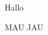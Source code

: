 \documentclass[Dokumentation]{Lilly}
\begin{document}
Hallo

\makeatletter
\ifLILLY@listings
MAU
\else
JAU
\fi
\end{document}
